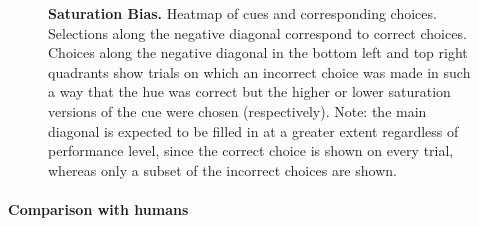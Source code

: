 \begin{figure}

\caption{\textbf{Saturation Bias.}
Heatmap of cues and corresponding choices. Selections along the negative diagonal correspond to correct choices. Choices along the negative diagonal in the bottom left and top right quadrants show trials on which an incorrect choice was made in such a way that the hue was correct but the higher or lower saturation versions of the cue were chosen (respectively). Note: the main diagonal is expected to be filled in at a greater extent regardless of performance level, since the correct choice is shown on every trial, whereas only a subset of the incorrect choices are shown.}
\label{fig:saturationBias}
\end{figure}



\paragraph{Comparison with humans} %